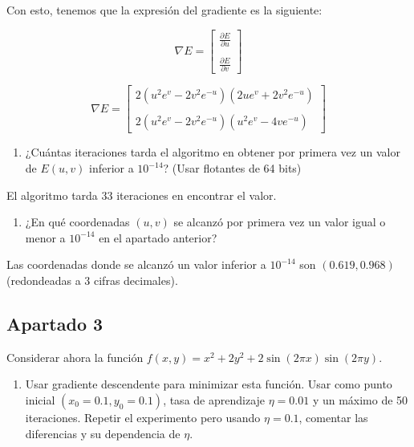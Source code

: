 \documentclass[11pt,a4paper]{article}
\begin{document}
Con esto, tenemos que la expresión del gradiente es la siguiente:

\begin{equation}
\nabla E =
\left[ {
\begin{array}{c}
	\frac{\partial E}{\partial u} \\
	\\
	\frac{\partial E}{\partial v}
\end{array}
} \right]
\end{equation}

\begin{equation}
\nabla E =
\left[ {
\begin{array}{c}
	2(u^2 e^v - 2 v^2 e^{-u})(2ue^v + 2 v^2 e^{-u}) \\
	\\
	2(u^2 e^v - 2 v^2 e^{-u})(u^2 e^v -4 v e^{-u})
\end{array}
} \right]
\end{equation}

\begin{enumerate}[resume, label=\alph*)]
	\item ¿Cuántas iteraciones tarda el algoritmo en obtener por primera vez un valor de $E(u, v)$ inferior a $10^{-14}$?
	(Usar flotantes de 64 bits)
\end{enumerate}

El algoritmo tarda 33 iteraciones en encontrar el valor.

\begin{enumerate}[resume, label=\alph*)]
	\item ¿En qué coordenadas $(u, v)$ se alcanzó por primera vez un valor igual o menor a $10^{-14}$ en el apartado anterior?
\end{enumerate}

Las coordenadas donde se alcanzó un valor inferior a $10^{-14}$ son $(0.619, 0.968)$ (redondeadas a 3 cifras decimales).

\subsection*{Apartado 3}
\noindent Considerar ahora la función $f(x, y) = x^2 + 2y^2 + 2\sin(2 \pi x)\sin(2 \pi y)$.

\begin{enumerate}[label=\alph*)]
	\item Usar gradiente descendente para minimizar esta función. Usar como punto inicial $(x_0 = 0.1, y_0 = 0.1)$,
	tasa de aprendizaje $\eta = 0.01$ y un máximo de 50 iteraciones. Repetir el experimento pero usando $\eta = 0.1$,
	comentar las diferencias y su dependencia de $\eta$.
\end{enumerate}
\end{document}

